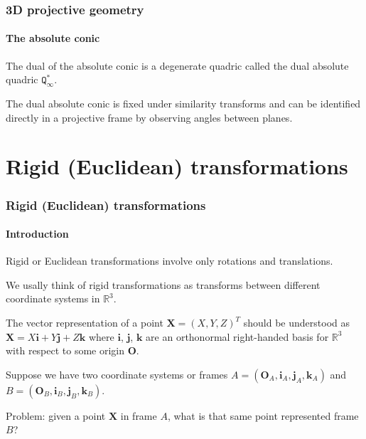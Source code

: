 \documentclass[aspectratio=169]{beamer}
\renewcommand{\vec}[1]{\boldsymbol{#1}}
\newcommand{\mat}[1]{\mathtt{#1}}
\def\Rset{\mathbb{R}}
\begin{document}
\begin{frame}
\frametitle{3D projective geometry}
\framesubtitle{The absolute conic}

The dual of the absolute conic is a degenerate quadric called the
\alert{dual absolute quadric} $\mat{Q}^*_{\infty}$.

\medskip

The dual absolute conic is \alert{fixed under similarity transforms}
and can be identified directly in a projective frame by observing
angles between planes.

\end{frame}

\section{Rigid (Euclidean) transformations}

\begin{frame}
\frametitle{Rigid (Euclidean) transformations}
\framesubtitle{Introduction}

\alert{Rigid} or Euclidean transformations involve only rotations and
translations.

\medskip

We usally think of rigid transformations as \alert{transforms between
  different coordinate systems} in $\Rset^3$.

\medskip

The vector representation of a point $\vec{X} = (X,Y,Z)^T$ should be
understood as $\vec{X} = X\vec{i} + Y\vec{j} + Z\vec{k}$ where
$\vec{i}$, $\vec{j}$, $\vec{k}$ are an orthonormal right-handed basis
for $\Rset^3$ with respect to some origin $\vec{O}$.

\medskip

Suppose we have two coordinate systems or frames $A =
(\vec{O}_A,\vec{i}_A,\vec{j}_A,\vec{k}_A)$ and $B =
(\vec{O}_B,\vec{i}_B,\vec{j}_B,\vec{k}_B).$

\medskip

Problem: given a point $\vec{X}$ in frame $A$, what is that same point
represented frame $B$?

\end{frame}
\end{document}
